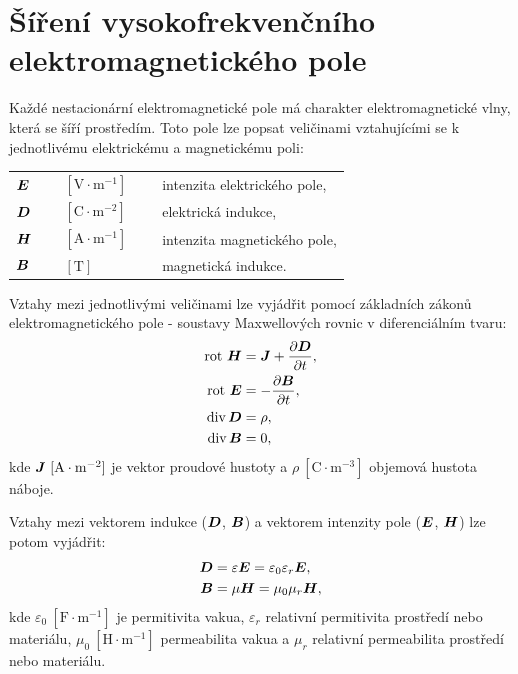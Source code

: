 \documentclass[12pt,a4paper,oneside]{article}
\numberwithin{equation}{section} %
\numberwithin{figure}{section} %
\numberwithin{table}{section} %
\renewcommand{\vec}[1]{\mbox{\boldmath$#1$}} %
\newcommand{\rot}{\mathrm{rot}\ }
\begin{document}
\section{Šíření vysokofrekvenčního elektromagnetického pole}
\label{propagation}
Každé nestacionární elektromagnetické pole má charakter elektromagnetické vlny, která se šíří prostředím. Toto pole lze popsat veličinami vztahujícími se k jednotlivému elektrickému a magnetickému poli:
\begin{table}[h] %
\begin{center} %
\begin{tabular}{l l l}
$\vec{E}$~~~ & $\mathrm{[V \cdot m^{-1}]}$~~~ & intenzita elektrického pole, \\ 
$\vec{D}$ & $\mathrm{[C \cdot m^{-2}]}$ & elektrická indukce, \\ 
$\vec{H}$ & $\mathrm{[A \cdot m^{-1}]}$ & intenzita magnetického pole, \\ 
$\vec{B}$ & $\mathrm{[T]}$ & magnetická indukce. \\ 
\end{tabular} 
\end{center}
\end{table}

Vztahy mezi jednotlivými veličinami lze vyjádřit pomocí základních zákonů elektromagnetického pole - soustavy Maxwellových rovnic v diferenciálním tvaru:
\begin{subequations}
\begin{align}
\label{maxdif1}
\rot \vec{H} &= \vec{J} + \frac{\partial \vec{D}}{\partial t},
\\
\label{maxdif2}
\rot \vec{E} &= - \frac{\partial \vec{B}}{\partial t},
\\
\label{maxdif3}
\udiv \vec{D} &= \rho,
\\
\label{maxdif4}
\udiv \vec{B} &= 0,
\end{align}
\end{subequations}
kde $\vec{J} ~\mathrm{[A \cdot m^{-2}]}$ je vektor proudové hustoty a $\rho ~\mathrm{[C \cdot m^{-3}]}$ objemová hustota náboje. 

Vztahy mezi vektorem indukce ($\vec{D}$, $\vec{B}$) a vektorem intenzity pole ($\vec{E}$, $\vec{H}$) lze potom vyjádřit:
\begin{subequations}
\begin{align}
\label{epsilonE}
\vec{D} &= \varepsilon \vec{E} = \varepsilon _0 \varepsilon _r \vec{E},
\\
\label{muH}
\vec{B} &= \mu \vec{H} = \mu _0 \mu _r \vec{H},
\end{align}
\end{subequations}
kde $\varepsilon _0 ~\mathrm{[F \cdot m^{-1}]}$ je permitivita vakua, $\varepsilon _r$ relativní permitivita prostředí nebo materiálu, $\mu _0 ~\mathrm{[H \cdot m^{-1}]}$ permeabilita vakua a $\mu _r$ relativní permeabilita prostředí nebo materiálu.
\end{document}

